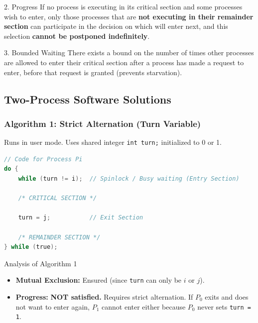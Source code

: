 \documentclass[10pt,a4paper]{article}
\begin{document}
\begin{conceptcard}{2. Progress}
If no process is executing in its critical section and some processes wish to enter, only those processes that are \textbf{not executing in their remainder section} can participate in the decision on which will enter next, and this selection \textbf{cannot be postponed indefinitely}.
\end{conceptcard}

\begin{conceptcard}{3. Bounded Waiting}
There exists a bound on the number of times other processes are allowed to enter their critical section after a process has made a request to enter, before that request is granted (prevents starvation).
\end{conceptcard}

\subsection{Two-Process Software Solutions}

\subsubsection{Algorithm 1: Strict Alternation (Turn Variable)}
Runs in user mode. Uses shared integer \texttt{int turn;} initialized to 0 or 1.

\begin{lstlisting}[language=C]
// Code for Process Pi
do {
    while (turn != i);  // Spinlock / Busy waiting (Entry Section)
    
    /* CRITICAL SECTION */
    
    turn = j;           // Exit Section
    
    /* REMAINDER SECTION */
} while (true);
\end{lstlisting}

\begin{alertbox}{Analysis of Algorithm 1}
\begin{itemize}
    \item \textbf{Mutual Exclusion:} Ensured (since \texttt{turn} can only be $i$ or $j$).
    \item \textbf{Progress:} \textbf{NOT satisfied.} Requires strict alternation. If $P_0$ exits and does not want to enter again, $P_1$ cannot enter either because $P_0$ never sets \texttt{turn = 1}.
\end{itemize}
\end{alertbox}
\end{document}
